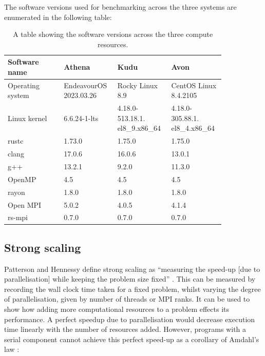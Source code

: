 The software versions used for benchmarking across the three systems are enumerated in the following table:

\begin{table}[H]
    \caption{A table showing the software versions across the three compute resources.}
    \label{table:perfTools}
    \begin{tabular}{|p{0.24\linewidth}||p{0.2\linewidth}|p{0.2\linewidth}|p{0.2\linewidth}|}
    \hline
    Software name   & Athena                           & Kudu                           & Avon                           \\ \hline\hline
    Operating system & EndeavourOS 2023.03.26 & Rocky Linux 8.9                & CentOS Linux 8.4.2105          \\\hline
    Linux kernel     & 6.6.24-1-lts                     & 4.18.0-513.18.1. el8\_9.x86\_64 & 4.18.0-305.88.1. el8\_4.x86\_64 \\\hline
    rustc            & 1.73.0                           & 1.75.0                         & 1.75.0                         \\\hline
    clang            & 17.0.6                           & 16.0.6                         & 13.0.1                         \\\hline
    g++              & 13.2.1                           & 9.2.0                          & 11.3.0                         \\\hline
    OpenMP           & 4.5                              & 4.5                            & 4.5                            \\\hline
    rayon            & 1.8.0                            & 1.8.0                          & 1.8.0                          \\\hline
    Open MPI         & 5.0.2                            & 4.0.5                          & 4.1.4                          \\\hline
    rs-mpi           & 0.7.0                            & 0.7.0                          & 0.7.0                         \\\hline
    \end{tabular}
\end{table}


\subsection{Strong scaling}
\label{ssec:strong-scaling}

Patterson and Hennessy define strong scaling as ``measuring the speed-up [due to parallelisation] while keeping the problem size fixed'' \cite{pattersonHennessyComputerOrganisationArchitecture}. This can be measured by recording the wall clock time taken for a fixed problem, whilst varying the degree of parallelisation, given by number of threads or MPI ranks. It can be used to show how adding more computational resources to a problem effects its performance. A perfect speedup due to parallelisation would decrease execution time linearly with the number of resources added. However, programs with a serial component cannot achieve this perfect speed-up as a corollary of Amdahl's law \cite{amdahlsLaw}:

